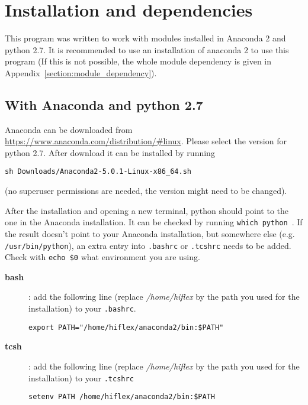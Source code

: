 \documentclass[10pt,a4paper]{article}
\begin{document}


\newpage
\section{Installation and dependencies}
\label{Section:installation}

\noindent This program was written to work with modules installed in Anaconda 2 and python 2.7. It is recommended to use an installation of anaconda 2 to use this program (If this is not possible, the whole module dependency is given in Appendix~\ref{section:module_dependency}).


\subsection{With Anaconda and python 2.7}

\noindent Anaconda can be downloaded from \url{https://www.anaconda.com/distribution/#linux}. Please select the version for python 2.7. After download it can be installed by running
\begin{lstlisting}[style=base]
sh Downloads/Anaconda2-5.0.1-Linux-x86_64.sh
\end{lstlisting}
(no superuser permissions are needed, the version might need to be changed).

After the installation and opening a new terminal, python should point to the one in the Anaconda installation. It can be checked by running \verb|which python|~. %
If the result doesn't point to your Anaconda installation, but somewhere else (e.g. \verb|/usr/bin/python|), an extra entry into \verb|.bashrc| or \verb|.tcshrc| needs to be added. Check with \verb|echo $0| what environment you are using.
\begin{description}
  \item[\textbf{bash}]: add the following line (replace \textit{/home/hiflex} by the path you used for the installation) to your \verb|.bashrc|. %
    \begin{lstlisting}[style=base]
export PATH="/home/hiflex/anaconda2/bin:$PATH"
    \end{lstlisting}
  \item[\textbf{tcsh}]: add the following line (replace \textit{/home/hiflex} by the path you used for the installation) to your \verb|.tcshrc|
    \begin{lstlisting}[style=base]
setenv PATH /home/hiflex/anaconda2/bin:$PATH
    \end{lstlisting}
\end{description}
\end{document}
